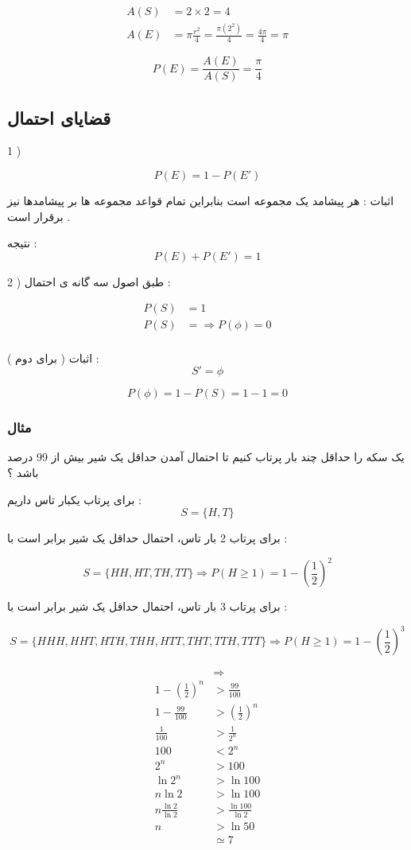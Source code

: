 \documentclass[12pt]{book}
\begin{document}
\begin{align*}
A(S) &= 2 \times 2  = 4 \\
A(E) &= \pi \frac{r^{2}}{4} = \frac{\pi (2^{2})}{4} = \frac{4\pi}{4} = \pi 
\end{align*}


$$
P(E) = \frac{A(E)}{A(S)} = \frac{\pi}{4}
$$

\subsection{قضایای احتمال}

1 ) 

$$
P(E) = 1 - P(E')
$$

اثبات : هر پیشامد یک مجموعه است بنابراین تمام قواعد مجموعه ها بر پیشامدها نیز برقرار است .

نتیجه : 
$$
P(E) + P(E') = 1
$$

2 ) طبق اصول سه گانه ی احتمال :

\begin{align*}
P(S) &= 1 \\
P(S) &= \Rightarrow P(\phi) = 0 \\ 
\end{align*}

اثبات ( برای دوم ) :
$$
S' = \phi
$$

$$
P(\phi) = 1 - P(S) = 1 - 1 = 0
$$


\subsubsection{مثال}

یک سکه را حداقل چند بار پرتاب کنیم تا احتمال آمدن حداقل یک شیر بیش از 99 درصد باشد ؟

برای پرتاب یکبار تاس داریم :
$$
S = \{ H , T \}
$$

برای پرتاب 2 بار تاس، احتمال حداقل یک شیر برابر است با :

$$
S = \{ HH , HT, TH, TT \}  \Rightarrow P( H \geq 1 ) = 1 -(\frac{1}{2})^{2}
$$

برای پرتاب 3 بار تاس، احتمال حداقل یک شیر برابر است با :


$$
S = \{ HHH , HHT, HTH, THH, HTT, THT, TTH, TTT \}  \Rightarrow P( H \geq 1 ) = 1 -(\frac{1}{2})^{3}
$$


\begin{align*}
&\Rightarrow \\
1 - (\frac{1}{2})^{n} &> \frac{99}{100} \\
1 - \frac{99}{100} &> (\frac{1}{2})^{n} \\
\frac{1}{100} &> \frac{1}{2^{n}} \\
100 &< 2^{n} \\
2^{n} &> 100 \\
\ln{2^{n}} &> \ln{100} \\
n \ln{2} &> \ln{100} \\
n \frac{ \ln{2}}{ \ln{2}} &> \frac{ \ln{100}}{ \ln{2}} \\
n &> \ln{50} \\
&\simeq 7
\end{align*}
\end{document}
